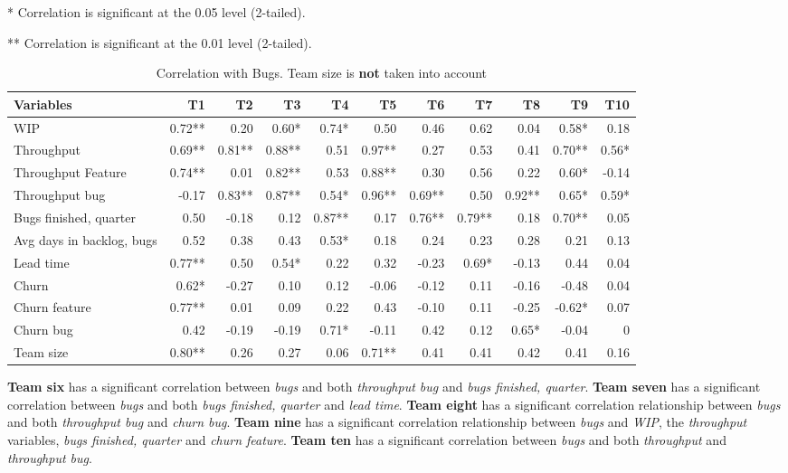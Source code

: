 \documentclass[UKenglish]{ifimaster}  %
\begin{document}
\begin{table}[h]
 \caption{Correlation with Bugs.  Team size is \textbf{not} taken into account}
 \centerline {* Correlation is significant at the 0.05 level (2-tailed).}
\centerline{** Correlation is significant at the 0.01 level (2-tailed).}
 \begin{adjustwidth}{-2cm}{}
 \centering
 \begin{tabular}{|l|r|r|r|r|r|r|r|r|r|r|}
\hline
 \textbf{Variables} & \bf{T1} & \bf{T2} & \bf{T3} & \bf{T4} & \bf{T5} & \bf{T6} & \bf{T7} & \bf{T8} & \bf{T9} & \bf{T10}\\ \hline
 WIP  & 0.72** & 0.20 & 0.60* & 0.74* & 0.50 & 0.46 & 0.62 & 0.04 & 0.58* & 0.18 \\ \hline
 Throughput  & 0.69** & 0.81** & 0.88** & 0.51 & 0.97** & 0.27 & 0.53 & 0.41 & 0.70** & 0.56* \\ \hline
 Throughput Feature  & 0.74** & 0.01 & 0.82** & 0.53 & 0.88** & 0.30 & 0.56 & 0.22 & 0.60* & -0.14 \\ \hline
 Throughput bug  & -0.17 & 0.83** & 0.87** & 0.54* & 0.96** & 0.69** & 0.50 & 0.92** & 0.65* & 0.59* \\ \hline
 Bugs finished, quarter  & 0.50 & -0.18 & 0.12 & 0.87** & 0.17 & 0.76** & 0.79** & 0.18 & 0.70** & 0.05 \\ \hline
 Avg days in backlog, bugs  & 0.52 & 0.38 & 0.43 & 0.53* & 0.18 & 0.24 & 0.23 & 0.28 & 0.21 & 0.13 \\ \hline
 Lead time  & 0.77** & 0.50 & 0.54* & 0.22 & 0.32 & -0.23 & 0.69* & -0.13 & 0.44 & 0.04 \\ \hline
 Churn  & 0.62* & -0.27 & 0.10 & 0.12 & -0.06 & -0.12 & 0.11 & -0.16 & -0.48 & 0.04 \\ \hline
 Churn feature  & 0.77** & 0.01 & 0.09 & 0.22 & 0.43 & -0.10 & 0.11 & -0.25 & -0.62* & 0.07 \\ \hline
 Churn bug  & 0.42 & -0.19 & -0.19 & 0.71* & -0.11 & 0.42 & 0.12 & 0.65* & -0.04 & 0\\ \hline
 Team size  & 0.80** & 0.26 & 0.27 & 0.06 & 0.71** & 0.41 & 0.41 & 0.42 & 0.41 & 0.16 \\ \hline
\end{tabular}
 \label{corr:bug}
\end{adjustwidth}
\end{table}


\textbf{Team six} has a significant correlation between \textit{bugs} and both \textit{throughput bug} and \textit{bugs finished, quarter}. \textbf{Team seven} has a significant correlation  between \textit{bugs} and both \textit{bugs finished, quarter} and \textit{lead time}. \textbf{Team eight} has a significant correlation relationship  between \textit{bugs} and both \textit{throughput bug} and \textit{churn bug}. \textbf{Team nine} has a significant correlation relationship  between \textit{bugs} and \textit{WIP}, the \textit{throughput} variables, \textit{bugs finished, quarter} and \textit{churn feature}. \textbf{Team ten} has a significant correlation  between \textit{bugs} and both \textit{throughput} and \textit{throughput bug}.
\end{document}
